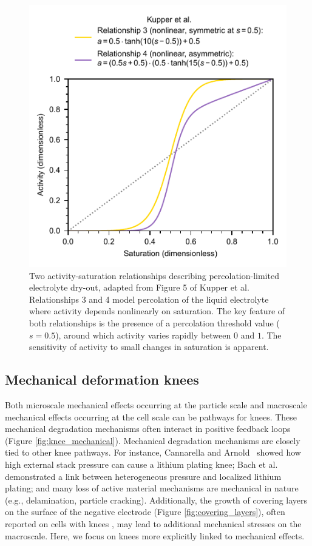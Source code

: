 \documentclass[journal=jpclcd,manuscript=article]{achemso}
\begin{document}
\begin{figure}[ht]
    \centering
    \includegraphics[scale=1.0]{final_figures/percolation.pdf}
    \caption{Two activity-saturation relationships describing percolation-limited electrolyte dry-out, adapted from Figure 5 of Kupper et al.\cite{kupper_end--life_2018} Relationships 3 and 4 model percolation of the liquid electrolyte where activity depends nonlinearly on saturation. The key feature of both relationships is the presence of a percolation threshold value ($s=0.5$), around which activity varies rapidly between $0$ and $1$.
    The sensitivity of activity to small changes in saturation is apparent.}
    \label{fig:percolation}
\end{figure}

\subsection{Mechanical deformation knees}

Both microscale mechanical effects occurring at the particle scale and macroscale mechanical effects occurring at the cell scale can be pathways for knees.
These mechanical degradation mechanisms often interact in positive feedback loops (Figure \ref{fig:knee_mechanical}).
Mechanical degradation mechanisms are closely tied to other knee pathways. For instance, Cannarella and Arnold~\cite{cannarella_stress_2014} showed how high external stack pressure can cause a lithium plating knee; Bach et al.\cite{bach_nonlinear_2016} demonstrated a link between heterogeneous pressure and localized lithium plating; and many loss of active material mechanisms are mechanical in nature (e.g., delamination, particle cracking).
Additionally, the growth of covering layers on the surface of the negative electrode (Figure \ref{fig:covering_layers}), often reported on cells with knees \cite{lewerenz_post-mortem_2017,willenberg_development_2020,stiaszny_electrochemical_2014, fang_capacity_2021}{}, may lead to additional mechanical stresses on the macroscale.
Here, we focus on knees more explicitly linked to mechanical effects.
\end{document}
